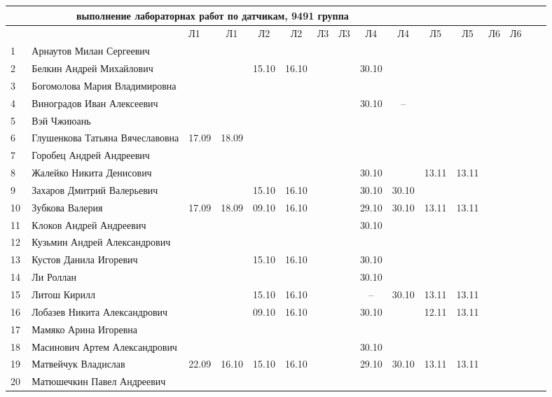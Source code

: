 \newpage
%


\newpage
%
\begin{tabular}{l|llccccccccccccc}
\multicolumn{10}{c}{выполнение лабораторнах работ по датчикам, 9491 группа} \\
\toprule
&&Л1&Л1& Л2&Л2& Л3&Л3& Л4&Л4 &Л5&Л5& Л6&Л6\\
\midrule
1\,& Арнаутов Милан Сергеевич         \\
2\,& Белкин Андрей Михайлович         &    &      &15.10&16.10 &     &      &30.10&\\
3\,& Богомолова Мария Владимировна    \\
4\,& Виноградов Иван Алексеевич       &     &     &     &      &     &      &30.10&--\\
5\,& Вэй Чжиюань                      \\
\midrule
6\,& Глушенкова Татьяна Вячеславовна  &17.09&18.09&     &      &     &\\
7\,& Горобец Андрей Андреевич         \\
8\,& Жалейко Никита Денисович         &     &     &     &      &     &      &30.10&     &13.11&13.11\\
9\,& Захаров Дмитрий Валерьевич       &     &     &15.10&16.10 &     &      &30.10&30.10\\
10\,& Зубкова Валерия                 &17.09&18.09&09.10&16.10 &     &      &29.10&30.10&13.11&13.11\\
\midrule
11\,& Клоков Андрей Андреевич         &     &     &     &      &     &      &30.10&\\
12\,& Кузьмин Андрей Александрович    \\
13\,& Кустов Данила Игоревич          &     &     &15.10&16.10 &     &      &30.10&\\
14\,& Ли Роллан                       &     &     &     &      &     &      &30.10&\\
15\,& Литош Кирилл                    &     &     &15.10&16.10 &     &      & --  &30.10&13.11&13.11\\
\midrule
16\,& Лобазев Никита Александрович    &     &     &09.10&16.10 &     &      &30.10&     &12.11&13.11\\
17\,& Мамяко Арина Игоревна           \\
18\,& Масинович Артем Александрович   &     &     &     &      &     &      &30.10&\\
19\,& Матвейчук Владислав             &22.09&16.10&15.10&16.10 &     &      &29.10&30.10&13.11&13.11\\
20\,& Матюшечкин Павел Андреевич      \\

\end{tabular}
